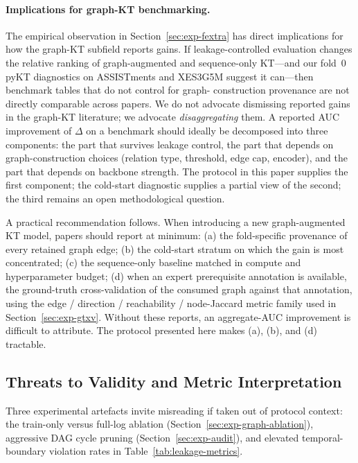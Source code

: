 \documentclass[runningheads]{llncs}
\begin{document}
\paragraph{Implications for graph-KT benchmarking.}
The empirical observation in Section~\ref{sec:exp-fextra} has direct
implications for how the graph-KT subfield reports gains. If
leakage-controlled evaluation changes the relative ranking of
graph-augmented and sequence-only KT---and our fold~0 pyKT diagnostics on
ASSISTments and XES3G5M suggest it can---then benchmark tables that do not control for graph-
construction provenance are not directly comparable across papers. We
do not advocate dismissing reported gains in the graph-KT literature;
we advocate \emph{disaggregating} them. A reported AUC improvement of
$\Delta$ on a benchmark should ideally be decomposed into three
components: the part that survives leakage control, the part that
depends on graph-construction choices (relation type, threshold, edge
cap, encoder), and the part that depends on backbone strength. The
protocol in this paper supplies the first component; the cold-start
diagnostic supplies a partial view of the second; the third remains an
open methodological question.

A practical recommendation follows. When introducing a new
graph-augmented KT model, papers should report at minimum: (a) the
fold-specific provenance of every retained graph edge; (b) the
cold-start stratum on which the gain is most concentrated; (c) the
sequence-only baseline matched in compute and hyperparameter budget;
(d) when an expert prerequisite annotation is available, the
ground-truth cross-validation of the consumed graph against that
annotation, using the edge / direction / reachability / node-Jaccard
metric family used in Section~\ref{sec:exp-gtxv}. Without these
reports, an aggregate-AUC improvement is difficult to attribute. The
protocol presented here makes (a), (b), and (d) tractable.

\subsection{Threats to Validity and Metric Interpretation}
\label{sec:threats-validity}
Three experimental artefacts invite misreading if taken out of protocol
context: the train-only versus full-log ablation (Section~\ref{sec:exp-graph-ablation}),
aggressive DAG cycle pruning (Section~\ref{sec:exp-audit}), and elevated
temporal-boundary violation rates in Table~\ref{tab:leakage-metrics}.
\end{document}
